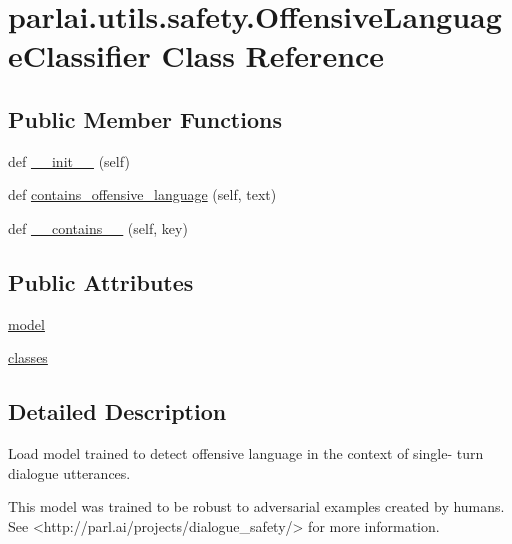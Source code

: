 \hypertarget{classparlai_1_1utils_1_1safety_1_1OffensiveLanguageClassifier}{}\section{parlai.\+utils.\+safety.\+Offensive\+Language\+Classifier Class Reference}
\label{classparlai_1_1utils_1_1safety_1_1OffensiveLanguageClassifier}
\subsection*{Public Member Functions}
\begin{DoxyCompactItemize}
\item 
def \hyperlink{classparlai_1_1utils_1_1safety_1_1OffensiveLanguageClassifier_a93630f9592ceded8584a09a0b9553ab5}{\+\_\+\+\_\+init\+\_\+\+\_\+} (self)
\item 
def \hyperlink{classparlai_1_1utils_1_1safety_1_1OffensiveLanguageClassifier_a7f4e833bea93ab9f920f2dd2a4b6e586}{contains\+\_\+offensive\+\_\+language} (self, text)
\item 
def \hyperlink{classparlai_1_1utils_1_1safety_1_1OffensiveLanguageClassifier_a86de8f64f68732b91d4cdfdf65dd841c}{\+\_\+\+\_\+contains\+\_\+\+\_\+} (self, key)
\end{DoxyCompactItemize}
\subsection*{Public Attributes}
\begin{DoxyCompactItemize}
\item 
\hyperlink{classparlai_1_1utils_1_1safety_1_1OffensiveLanguageClassifier_a917240edc6718f3b7f3560214780ac9d}{model}
\item 
\hyperlink{classparlai_1_1utils_1_1safety_1_1OffensiveLanguageClassifier_a4230d2f45693c00e565fa90d7bae2d2a}{classes}
\end{DoxyCompactItemize}


\subsection{Detailed Description}
\begin{DoxyVerb}Load model trained to detect offensive language in the context of single- turn
dialogue utterances.

This model was trained to be robust to adversarial examples created by humans. See
<http://parl.ai/projects/dialogue_safety/> for more information.
\end{DoxyVerb}
 

